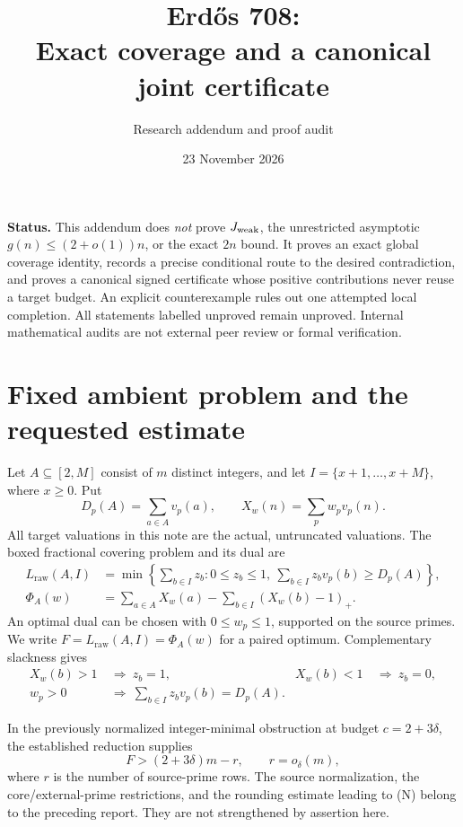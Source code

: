 \documentclass[11pt,a4paper]{article}
\title{\vspace{-13mm}Erd\H{o}s 708:\\Exact coverage and a canonical joint certificate}
\author{Research addendum and proof audit}
\date{23 November 2026}
\newcommand{\pos}[1]{(#1)_+}
\newcommand{\Ph}{\Phi}
\newcommand{\raw}{L_{\mathrm{raw}}}
\begin{document}
\maketitle
\vspace{-5mm}
\noindent\textbf{Status.}
This addendum does \emph{not} prove \(J_{\rm weak}\), the unrestricted
asymptotic \(g(n)\le(2+o(1))n\), or the exact \(2n\) bound.
It proves an exact global coverage identity, records a precise conditional
route to the desired contradiction, and proves a canonical signed
certificate whose positive contributions never reuse a target budget.
An explicit counterexample rules out one attempted local completion.
All statements labelled unproved remain unproved. Internal mathematical
audits are not external peer review or formal verification.

\section{Fixed ambient problem and the requested estimate}
Let \(A\subseteq[2,M]\) consist of \(m\) distinct integers, and let
\(I=\{x+1,\ldots,x+M\}\), where \(x\ge0\). Put
\[
 D_p(A)=\sum_{a\in A}v_p(a),\qquad
 X_w(n)=\sum_p w_pv_p(n).
\]
All target valuations in this note are the actual, untruncated valuations.
The boxed fractional covering problem and its dual are
\begin{align}
 \raw(A,I)&=\min\left\{\sum_{b\in I}z_b:
 0\le z_b\le1,\ \sum_{b\in I}z_bv_p(b)\ge D_p(A)\right\},\\
 \Ph_A(w)&=\sum_{a\in A}X_w(a)
       -\sum_{b\in I}\pos{X_w(b)-1}.
\end{align}
An optimal dual can be chosen with \(0\le w_p\le1\), supported on the
source primes. We write \(F=\raw(A,I)=\Ph_A(w)\) for a paired optimum.
Complementary slackness gives
\begin{align}
 X_w(b)>1&\ \Longrightarrow\ z_b=1, &
 X_w(b)<1&\ \Longrightarrow\ z_b=0, \label{eq:cs1}\\
 w_p>0&\ \Longrightarrow\
 \sum_{b\in I}z_bv_p(b)=D_p(A). \label{eq:cs2}
\end{align}

In the previously normalized integer-minimal obstruction at budget
\(c=2+3\delta\), the established reduction supplies
\[
 F>(2+3\delta)m-r,\qquad r=o_\delta(m),
 \tag{N}
\]
where \(r\) is the number of source-prime rows. The source normalization,
the core/external-prime restrictions, and the rounding estimate leading
to (N) belong to the preceding report. They are not strengthened by
assertion here.
\end{document}
